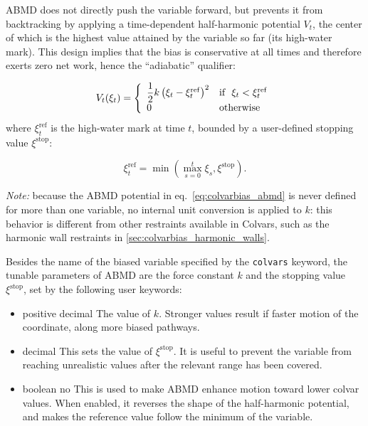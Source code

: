 ABMD does not directly push the variable forward, but prevents it from backtracking by applying a time-dependent half-harmonic potential $V_t$, the center of which is the highest value attained by the variable so far (its high-water mark).
This design implies that the bias is conservative at all times and therefore exerts zero net work, hence the ``adiabatic'' qualifier:

\begin{equation}
  \label{eq:colvarbias_abmd}
  V_t(\xi_t) = \left\{
    \begin{array}{l l}
      \dfrac{1}{2} k \left(\xi_t - \xi^{\mathrm{ref}}_t\right)^2 & \text{if }\ \xi_t < \xi^{\mathrm{ref}}_t \\
      0 & \text{otherwise}
    \end{array}
  \right.
\end{equation}
\noindent{}where $\xi^{\mathrm{ref}}_t$ is the high-water mark at time $t$, bounded by a user-defined stopping value $\xi^{\mathrm{stop}}$:

\begin{equation}
  \xi^{\mathrm{ref}}_t = \min\left(\max_{s=0}^{t} \xi_s, \xi^{\mathrm{stop}}\right).
\end{equation}

\emph{Note:} because the ABMD potential in eq.\ \ref{eq:colvarbias_abmd} is never defined for more than one variable, no internal unit conversion is applied to $k$: this behavior is different from other restraints available in Colvars, such as the harmonic wall restraints in \ref{sec:colvarbias_harmonic_walls}.

Besides the name of the biased variable specified by the \texttt{colvars} keyword, the tunable parameters of ABMD are the force constant $k$ and the stopping value $\xi^{\mathrm{stop}}$, set by the following user keywords:

\begin{itemize}
  \item %
    {positive decimal}
    {The value of $k$. Stronger values result if faster motion of the coordinate, along more biased pathways.}

  \item {}
   {decimal}
   {This sets the value of $\xi^{\mathrm{stop}}$. It is useful to prevent the variable from reaching unrealistic
    values after the relevant range has been covered.}

   \item
    {boolean}
    {no}
    {This is used to make ABMD enhance motion toward lower colvar values. When enabled, it reverses the shape of the
    half-harmonic potential, and makes the reference value follow the minimum of the variable.}

\end{itemize}

